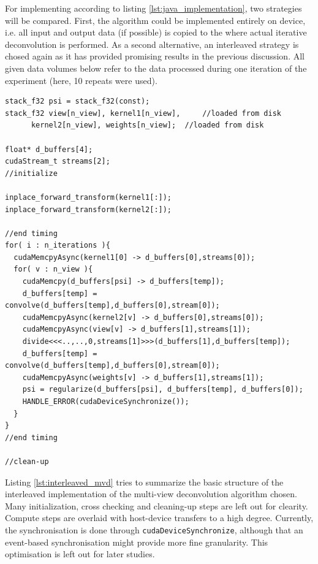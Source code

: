 For implementing \lmvn{} according to listing \ref{lst:java_implementation}, two strategies will be compared. First, the algorithm could be implemented entirely on device, i.e. all input and output data (if possible) is copied to the \gpu{} where actual iterative deconvolution is performed. As a second alternative, an interleaved strategy is chosed again as it has provided promising results in the previous discussion. All given data volumes below refer to the data processed during one iteration of the experiment (here, 10 repeats were used).  \newline

\begin{lstlisting}[caption={Interleaved implementation of Multi-View Deconvolution. The algorithm is given in pseudo-code based on the CUDA and \cufft{} API.},label={lst:interleaved_mvd}]
stack_f32 psi = stack_f32(const);
stack_f32 view[n_view], kernel1[n_view],     //loaded from disk
	  kernel2[n_view], weights[n_view];  //loaded from disk

float* d_buffers[4];
cudaStream_t streams[2];
//initialize

inplace_forward_transform(kernel1[:]);
inplace_forward_transform(kernel2[:]);

//end timing
for( i : n_iterations ){
  cudaMemcpyAsync(kernel1[0] -> d_buffers[0],streams[0]);  
  for( v : n_view ){
    cudaMemcpy(d_buffers[psi] -> d_buffers[temp]); 
    d_buffers[temp] = convolve(d_buffers[temp],d_buffers[0],stream[0]);
    cudaMemcpyAsync(kernel2[v] -> d_buffers[0],streams[0]);
    cudaMemcpyAsync(view[v] -> d_buffers[1],streams[1]);
    divide<<<..,..,0,streams[1]>>>(d_buffers[1],d_buffers[temp]);
    d_buffers[temp] = convolve(d_buffers[temp],d_buffers[0],stream[0]);
    cudaMemcpyAsync(weights[v] -> d_buffers[1],streams[1]);
    psi = regularize(d_buffers[psi], d_buffers[temp], d_buffers[0]);
    HANDLE_ERROR(cudaDeviceSynchronize());
  }
}
//end timing

//clean-up
\end{lstlisting}

Listing \ref{lst:interleaved_mvd} tries to summarize the basic structure of the interleaved implementation of the multi-view deconvolution algorithm chosen. Many initialization, cross checking and cleaning-up steps are left out for clearity. Compute steps are overlaid with host-device transfers to a high degree. Currently, the synchronisation is done through \texttt{cudaDeviceSynchronize}, although that an event-based synchronisation might provide more fine granularity. This optimisation is left out for later studies.\newline

